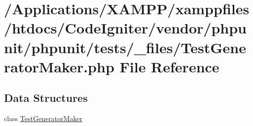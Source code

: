 \hypertarget{_test_generator_maker_8php}{}\section{/\+Applications/\+X\+A\+M\+P\+P/xamppfiles/htdocs/\+Code\+Igniter/vendor/phpunit/phpunit/tests/\+\_\+files/\+Test\+Generator\+Maker.php File Reference}
\label{_test_generator_maker_8php}
\subsection*{Data Structures}
\begin{DoxyCompactItemize}
\item 
class \mbox{\hyperlink{class_test_generator_maker}{Test\+Generator\+Maker}}
\end{DoxyCompactItemize}
